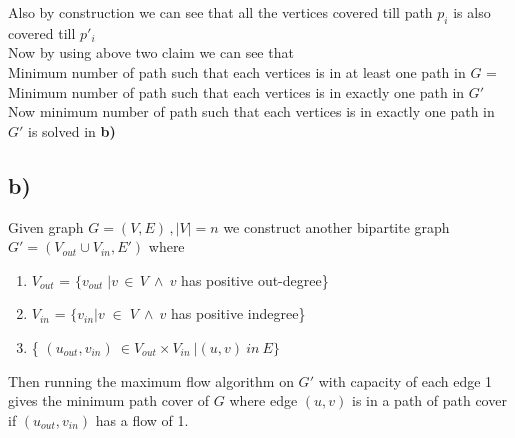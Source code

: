 \documentclass{report}
\begin{document}
 Also by construction we can see that all the vertices covered till path $p_i$ is also covered till $p'_i$\\
 
 Now by using above two claim we can see that\\
  Minimum number of path such that each vertices is in at least one path in $G$ = Minimum number of path such that each vertices is in exactly one path in $G'$\\
  
  Now minimum number of path such that each vertices is in exactly one path in $G'$ is solved in \textbf{b)}
 \subsection*{b)}
 Given graph $G = (V, E)\,, |V| = n $ we construct another bipartite graph $G' = (V_{out}\cup V_{in} ,E')$ where 
 \begin{enumerate}
     \item $V_{out}$ = $\{v_{out} \;| v \,\in\, V\: \land \: v$ has positive out-degree\}
     \item  $V_{in}$ = $\{v_{in} | v\;\in\; V\: \land \: v $ has positive indegree\}
     \item \{ $(u_{out},v_{in})\: \in V_{out}\times V_{in}\: | (u,v) \: in \: E\}$
 \end{enumerate}
 
 Then running the maximum flow algorithm on $G'$ with capacity of each edge 1 gives the minimum path cover of $G$ where edge $(u,v)$ is in a path of path cover if $(u_{out},v_{in})$ has a flow of 1.\\
 
\end{document}
